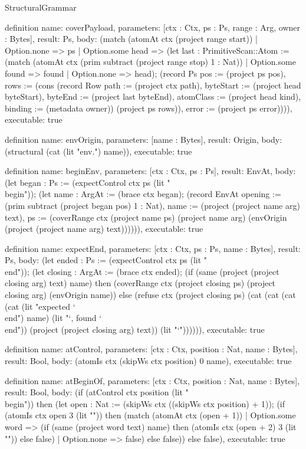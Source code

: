 \begin{lexlean}{StructuralGrammar}
\begin{semanticmodule}
{{definition{
  name: coverPayload,
  parameters: [ctx : Ctx, ps : Ps, range : Arg, owner : Bytes],
  result: Ps,
  body: (match (atomAt ctx (project range start))
    | Option.none => ps
    | Option.some head => (let last : PrimitiveScan::Atom := (match (atomAt ctx (prim subtract (project range stop) 1 : Nat))
      | Option.some found => found
      | Option.none => head); (record Ps {pos := (project ps pos), rows := (cons (record Row {path := (project ctx path), byteStart := (project head byteStart), byteEnd := (project last byteEnd), atomClass := (project head kind), binding := (metadata owner)}) (project ps rows)), error := (project ps error)}))),
  executable: true
}

definition{
  name: envOrigin,
  parameters: [name : Bytes],
  result: Origin,
  body: (structural (cat (lit "env.") name)),
  executable: true
}

definition{
  name: beginEnv,
  parameters: [ctx : Ctx, ps : Ps],
  result: EnvAt,
  body: (let began : Ps := (expectControl ctx ps (lit "\\begin")); (let name : ArgAt := (brace ctx began); (record EnvAt {opening := (prim subtract (project began pos) 1 : Nat), name := (project (project name arg) text), ps := (coverRange ctx (project name ps) (project name arg) (envOrigin (project (project name arg) text)))}))),
  executable: true
}

definition{
  name: expectEnd,
  parameters: [ctx : Ctx, ps : Ps, name : Bytes],
  result: Ps,
  body: (let ended : Ps := (expectControl ctx ps (lit "\\end")); (let closing : ArgAt := (brace ctx ended); (if (same (project (project closing arg) text) name) then (coverRange ctx (project closing ps) (project closing arg) (envOrigin name)) else (refuse ctx (project closing ps) (cat (cat (cat (cat (lit "expected `\\end{") name) (lit "}`, found `\\end{")) (project (project closing arg) text)) (lit "}`")))))),
  executable: true
}

definition{
  name: atControl,
  parameters: [ctx : Ctx, position : Nat, name : Bytes],
  result: Bool,
  body: (atomIs ctx (skipWs ctx position) 0 name),
  executable: true
}

definition{
  name: atBeginOf,
  parameters: [ctx : Ctx, position : Nat, name : Bytes],
  result: Bool,
  body: (if (atControl ctx position (lit "\\begin")) then (let open : Nat := (skipWs ctx ((skipWs ctx position) + 1)); (if (atomIs ctx open 3 (lit "{")) then (match (atomAt ctx (open + 1))
    | Option.some word => (if (same (project word text) name) then (atomIs ctx (open + 2) 3 (lit "}")) else false)
    | Option.none => false) else false)) else false),
  executable: true
}

}}
\end{semanticmodule}
\end{lexlean}
